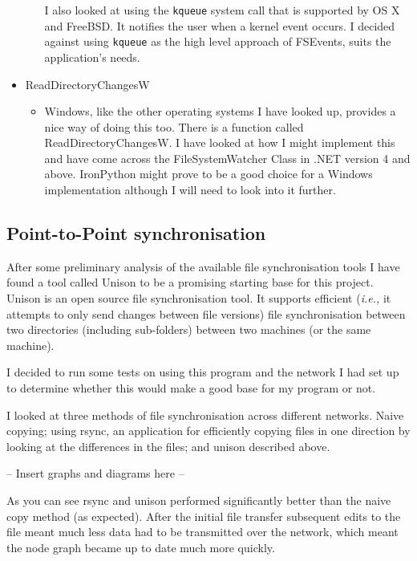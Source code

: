 \documentclass[12pt]{article}
\begin{document}
\begin{itemize}
\begin{itemize}
        I also looked at using the \texttt{kqueue} system call that is
        supported by OS X and FreeBSD. It notifies the user
        when a kernel event occurs. I decided against using
        \texttt{kqueue} as the high level approach of FSEvents,
        suits the application's needs.
        \end{itemize}

    \item ReadDirectoryChangesW
        \begin{itemize}
        \item Windows, like the other operating systems
        I have looked up, provides a nice way of doing this
        too. There is a function called ReadDirectoryChangesW.
        I have looked at how I might implement this
 and have
        come across the FileSystemWatcher Class in .NET version 4 and
        above. IronPython might prove to be a good choice for a
        Windows implementation although I will need to look
        into it further.
        \end{itemize}
\end{itemize}

\subsection{Point-to-Point synchronisation}
After some preliminary analysis of the available file synchronisation
tools I have found a tool called Unison to be a promising starting
base for this project. Unison is an open source file synchronisation tool.
It supports efficient (\emph{i.e.,} it attempts to only send changes between file versions) file synchronisation between two
directories (including sub-folders) between two machines (or the same
machine).

I decided to run some tests on using this program
and the network
I had set up to determine whether this would make a good base for
my program or not.

I looked at three methods of file synchronisation across
different networks. Naive copying; using rsync, an application
for efficiently copying files in one direction by looking at
the differences in the files; and unison described above.

-- Insert graphs and diagrams here --

As you can see rsync and unison performed significantly better
than the naive copy method (as expected). After the initial file
transfer subsequent edits to the file meant much less data had to
be transmitted over the network, which meant the node graph
became up to date much more quickly.
\end{document}
